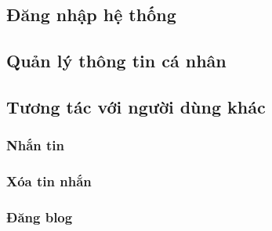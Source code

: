 \documentclass[./../main_file.tex]{subfiles}
\begin{document}
	



	\subsection{Đăng nhập hệ thống }
	\begin{figure}[H]
		\centering
		\resizebox{1.0\textwidth}{!}{}
	\end{figure}
	
	\subsection{Quản lý thông tin cá nhân  }
	\begin{figure}[H]
		\centering
		\resizebox{1.0\textwidth}{!}{}
	\end{figure}
	
	\subsection{Tương tác với người dùng khác }
	\subsubsection{Nhắn tin}
	\begin{figure}[H]
		\centering
		\resizebox{1.0\textwidth}{!}{}
	\end{figure}
	\subsubsection{Xóa tin nhắn}
	\begin{figure}[H]
		\centering
		\resizebox{1.0\textwidth}{!}{}
	\end{figure}
	\subsubsection{Đăng blog}
	\begin{figure}[H]
		\centering
		\resizebox{1.0\textwidth}{!}{}
	\end{figure}
\end{document}
